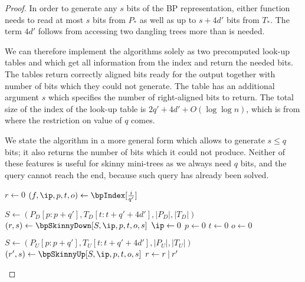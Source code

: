 \begin{proof}
	In order to generate any $s$ bits of the BP representation, either function needs to read at most $s$ bits from $P_*$ as well as up to $s + 4d'$ bits from $T_*$.
	The term $4d'$ follows from accessing two dangling trees more than is needed.
	
	We can therefore implement the algorithms solely as two precomputed look-up tables \bpSkinnyDown{} and \bpSkinnyUp{} which get all information from the index and return the needed bits.
	The tables return correctly aligned bits ready for the output together with number of bits which they could not generate.
	The table has an additional argument $s$ which specifies the number of right-aligned bits to return.
	The total size of the index of the look-up table is $2q' + 4d' + O(\log \log n)$, which is from where the restriction on value of $q$ comes.
	
	We state the algorithm in a more general form which allows to generate $s \le q$ bits; it also returns the number of bits which it could not produce.
	Neither of these features is useful for skinny mini-trees as we always need $q$ bits, and the query cannot reach the end, because such query has already been solved.
	
	\begin{algorithm}
	\begin{algorithmic}
		\State $r \gets 0$ 
		\State $(f, \ip, p, t, o) \gets \bpIndex[\frac{i}{q'}]$
		
		 
			\State $S \gets (P_D[p:p+q'], T_D[t:t + q' + 4d'], |P_D|, |T_D|)$
			\State $(r, s) \gets \bpSkinnyDown[S, \ip, p, t, o, s]$
			\State $\ip \gets 0$%
			\Instr $p \gets 0$%
			\Instr $t \gets 0$%
			\Instr $o \gets 0$
		\EndIf
		
		 
			\State $S \gets (P_U[p:p+q'], T_U[t:t + q' + 4d'], |P_U|, |T_U|)$
			\State $(r', s) \gets \bpSkinnyUp[S, \ip, p, t, o, s]$
			\State $r \gets r \mathbin{|} r'$ 
		\EndIf
		
		\State {}
	\EndFunction
	\end{algorithmic}
	\end{algorithm}
\end{proof}

